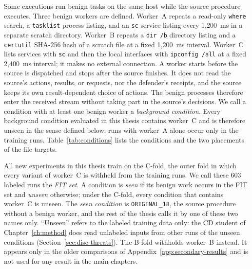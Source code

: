 Some executions run benign tasks on the same host while the source
procedure executes. Three benign workers are defined. Worker~A repeats a
read-only \texttt{where} search, a \texttt{tasklist} process listing, and
an \texttt{sc} service listing every 1,200~ms in a separate scratch
directory. Worker~B repeats a \texttt{dir /b} directory listing and a
\texttt{certutil} SHA-256 hash of a scratch file at a fixed 1,200~ms
interval. Worker~C lists services with \texttt{sc} and then the local
interfaces with \texttt{ipconfig /all} at a fixed 2,400~ms interval; it
makes no external connection. A worker starts before the source is
dispatched and stops after the source finishes. It does not read the
source's actions, results, or requests, nor the defender's receipts,
and the source keeps its own result-dependent choice of actions. The
benign processes therefore enter the received stream without taking
part in the source's decisions. We call a condition with at least one
benign worker a \emph{background condition}. Every background condition
evaluated in this thesis contains worker~C and is therefore unseen in the
sense defined below; runs with worker~A alone occur only in the training
runs. Table~\ref{tab:conditions} lists the conditions and the two
placements of the file targets.

All new experiments in this thesis train on the C-fold, the outer fold
in which every variant of worker~C is withheld from the training runs.
We call these 603 labeled runs the \emph{FIT set}. A condition is
\emph{seen} if its benign work occurs in the FIT set and \emph{unseen}
otherwise; under the C-fold, every condition that contains worker~C is
unseen. The \emph{seen condition} is \texttt{ORIGINAL\_18}, the source
procedure without a benign worker, and the rest of the thesis calls it
by one of these two names only. ``Unseen''
refers to the labeled training data only: the CD student of
Chapter~\ref{ch:method} does read unlabeled inputs from other runs of
the unseen conditions (Section~\ref{sec:disc-threats}). The B-fold withholds
worker~B instead. It appears only in the older comparisons of
Appendix~\ref{app:secondary-results} and is not used for any result in
the main chapters.

